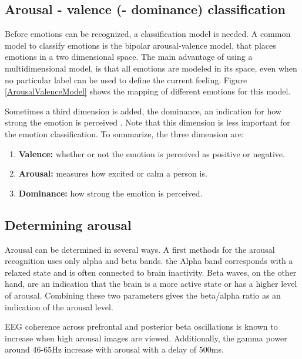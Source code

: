 \subsection{Arousal - valence (- dominance) classification}
Before emotions can be recognized, a classification model is needed. A common model to classify emotions is the bipolar arousal-valence model\cite{ExtendedPaper}\cite{RealTimeEEGEmotion}, that places emotions in a two dimensional space. The main advantage of using a multidimensional model, is that all emotions are modeled in its space, even when no particular label can be used to define the current feeling. Figure \ref{ArousalValenceModel} shows the mapping of different emotions for this model.

Sometimes a third dimension is added, the dominance, an indication for how strong the emotion is perceived \cite{EEGDatasets}. Note that this dimension is less important for the emotion classification. To summarize, the three dimension are:
\begin{enumerate}
\item \textbf{Valence:} whether or not the emotion is perceived as positive or negative.
\item \textbf{Arousal:} measures how excited or calm a person is.
\item \textbf{Dominance:} how strong the emotion is perceived.
\end{enumerate}


\subsection{Determining arousal}

Arousal can be determined in several ways. A first methods for the arousal recognition uses only alpha and beta bands. the Alpha band corresponds with a relaxed state and is often connected to brain inactivity\cite{ExtendedPaper}\cite{RealTimeEEGEmotion}. Beta waves, on the other hand, are an indication that the brain is a more active state or has a higher level of arousal. Combining these two parameters gives the beta/alpha ratio as an indication of the arousal level. 

\npar

EEG coherence across prefrontal and posterior beta oscillations is known to increase when high arousal images are viewed. Additionally, the gamma power around 46-65Hz increase with arousal with a delay of 500ms.

